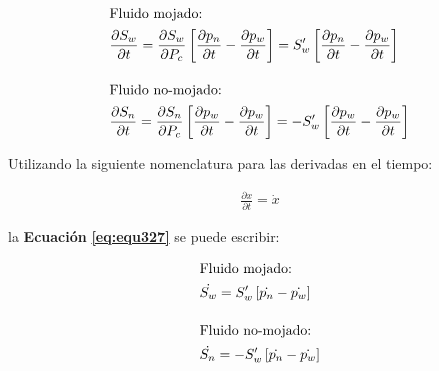 \begin{ceqn} 
\begin{subequations} \label{eq:equ327} 
\begin{align}
\shortintertext{Fluido mojado:}     &\frac{\partial S_w}{\partial t} = \frac{\partial S_w}{\partial P_c}\left[\frac{\partial p_n}{\partial t}-\frac{\partial p_w}{\partial t}\right] = S'_w\left[\frac{\partial p_n}{\partial t}-\frac{\partial p_w}{\partial t}\right] \label{eq:equ327a} \\[10pt]
\shortintertext{Fluido no-mojado:} 	&\frac{\partial S_n}{\partial t} = \frac{\partial S_n}{\partial P_c}\left[\frac{\partial p_w}{\partial t}-\frac{\partial p_w}{\partial t}\right] = -S'_w\left[\frac{\partial p_w}{\partial t}-\frac{\partial p_w}{\partial t}\right] \label{eq:equ327b}
\end{align}
\end{subequations} 
\end{ceqn}

\bigskip
Utilizando la siguiente nomenclatura para las derivadas en el tiempo:

\begin{ceqn} 
\begin{gather} \label{eq:equ328} 
\frac{\partial x}{\partial t} = \dot{x}
\end{gather}  
\end{ceqn}

la \textbf{Ecuación} \textbf{\ref{eq:equ327}} se puede escribir:

\begin{ceqn} 
\begin{subequations} \label{eq:equ329} 
\begin{align}
\shortintertext{Fluido mojado:}     &\dot{S_w} = S'_w\left[\dot{p_n}-\dot{ p_w}\right] \label{eq:equ329a} \\[10pt]
\shortintertext{Fluido no-mojado:} 	&\dot{S_n} = -S'_w\left[\dot{p_n}-\dot{ p_w}\right] \label{eq:equ329b}
\end{align}
\end{subequations} 
\end{ceqn}

